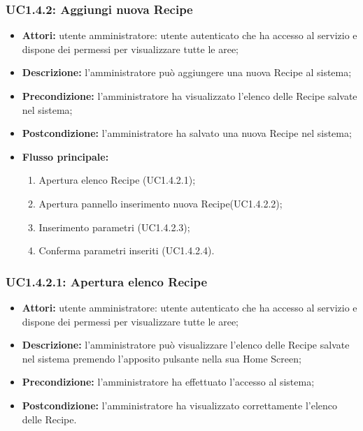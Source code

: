 \subsubsection{UC1.4.2: Aggiungi nuova Recipe}
\begin{itemize}
    \item \textbf{Attori:} utente amministratore: utente autenticato che ha accesso al servizio e dispone dei permessi per visualizzare tutte le aree;
    \item \textbf{Descrizione:} l'amministratore può aggiungere una nuova Recipe al sistema;
    \item \textbf{Precondizione:} l'amministratore ha visualizzato l'elenco delle Recipe salvate nel sistema;
    \item \textbf{Postcondizione:} l'amministratore ha salvato una nuova Recipe nel sistema;
	\item \textbf{Flusso principale:}

    \begin{enumerate}
        \item Apertura elenco Recipe (UC1.4.2.1);
        \item Apertura pannello inserimento nuova Recipe(UC1.4.2.2);
        \item Inserimento parametri (UC1.4.2.3);
        \item Conferma parametri inseriti (UC1.4.2.4).
    \end{enumerate}
\end{itemize}

\subsubsection{UC1.4.2.1: Apertura elenco Recipe}

\begin{itemize}
    \item \textbf{Attori:} utente amministratore: utente autenticato che ha accesso al servizio e dispone dei permessi per visualizzare tutte le aree;
    \item \textbf{Descrizione:} l'amministratore può visualizzare l'elenco delle Recipe salvate nel sistema premendo l'apposito pulsante nella sua Home Screen;
    \item \textbf{Precondizione:} l'amministratore ha effettuato l'accesso al sistema;
    \item \textbf{Postcondizione:} l'amministratore ha visualizzato correttamente l'elenco delle Recipe.
\end{itemize}

